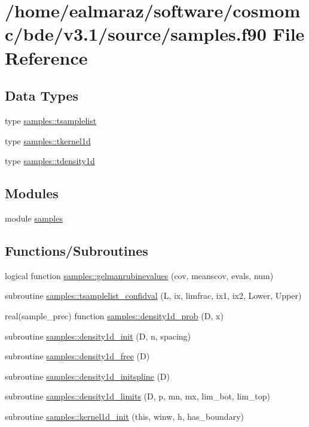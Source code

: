 \hypertarget{samples_8f90}{}\section{/home/ealmaraz/software/cosmomc/bde/v3.1/source/samples.f90 File Reference}
\label{samples_8f90}
\subsection*{Data Types}
\begin{DoxyCompactItemize}
\item 
type \mbox{\hyperlink{structsamples_1_1tsamplelist}{samples\+::tsamplelist}}
\item 
type \mbox{\hyperlink{structsamples_1_1tkernel1d}{samples\+::tkernel1d}}
\item 
type \mbox{\hyperlink{structsamples_1_1tdensity1d}{samples\+::tdensity1d}}
\end{DoxyCompactItemize}
\subsection*{Modules}
\begin{DoxyCompactItemize}
\item 
module \mbox{\hyperlink{namespacesamples}{samples}}
\end{DoxyCompactItemize}
\subsection*{Functions/\+Subroutines}
\begin{DoxyCompactItemize}
\item 
logical function \mbox{\hyperlink{namespacesamples_abaa5a3a56f0160fff42cc0ea3ac8a928}{samples\+::gelmanrubinevalues}} (cov, meanscov, evals, num)
\item 
subroutine \mbox{\hyperlink{namespacesamples_a1c105487cb30dfdb9dc2944330277e78}{samples\+::tsamplelist\+\_\+confidval}} (L, ix, limfrac, ix1, ix2, Lower, Upper)
\item 
real(sample\+\_\+prec) function \mbox{\hyperlink{namespacesamples_afdfd2cef6249d2d52f60f3b946035016}{samples\+::density1d\+\_\+prob}} (D, x)
\item 
subroutine \mbox{\hyperlink{namespacesamples_a81e4c9e95f7f4a62799689997c7be5e7}{samples\+::density1d\+\_\+init}} (D, n, spacing)
\item 
subroutine \mbox{\hyperlink{namespacesamples_a106842e32d665154377f9c3bc1682b59}{samples\+::density1d\+\_\+free}} (D)
\item 
subroutine \mbox{\hyperlink{namespacesamples_a87a98c09efa7d17b3ff7d0db04d66b73}{samples\+::density1d\+\_\+initspline}} (D)
\item 
subroutine \mbox{\hyperlink{namespacesamples_a65a3ed5d18fe56c9dbc21e5787d86047}{samples\+::density1d\+\_\+limits}} (D, p, mn, mx, lim\+\_\+bot, lim\+\_\+top)
\item 
subroutine \mbox{\hyperlink{namespacesamples_a34bf342dd43e661799227d0101cee393}{samples\+::kernel1d\+\_\+init}} (this, winw, h, has\+\_\+boundary)
\end{DoxyCompactItemize}
